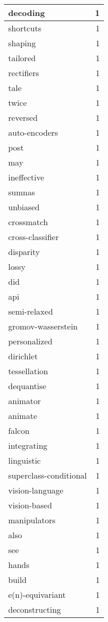 \begin{table}[h]
\begin{tabular}{|l|r|}
\hline
decoding & 1 \\
\hline
shortcuts & 1 \\
\hline
shaping & 1 \\
\hline
tailored & 1 \\
\hline
rectifiers & 1 \\
\hline
tale & 1 \\
\hline
twice & 1 \\
\hline
reversed & 1 \\
\hline
auto-encoders & 1 \\
\hline
post & 1 \\
\hline
may & 1 \\
\hline
ineffective & 1 \\
\hline
sumnas & 1 \\
\hline
unbiased & 1 \\
\hline
crossmatch & 1 \\
\hline
cross-classifier & 1 \\
\hline
disparity & 1 \\
\hline
lossy & 1 \\
\hline
did & 1 \\
\hline
api & 1 \\
\hline
semi-relaxed & 1 \\
\hline
gromov-wasserstein & 1 \\
\hline
personalized & 1 \\
\hline
dirichlet & 1 \\
\hline
tessellation & 1 \\
\hline
dequantise & 1 \\
\hline
animator & 1 \\
\hline
animate & 1 \\
\hline
falcon & 1 \\
\hline
integrating & 1 \\
\hline
linguistic & 1 \\
\hline
superclass-conditional & 1 \\
\hline
vision-language & 1 \\
\hline
vision-based & 1 \\
\hline
manipulators & 1 \\
\hline
also & 1 \\
\hline
see & 1 \\
\hline
hands & 1 \\
\hline
build & 1 \\
\hline
e(n)-equivariant & 1 \\
\hline
deconstructing & 1 \\

\end{tabular}
\end{table}
